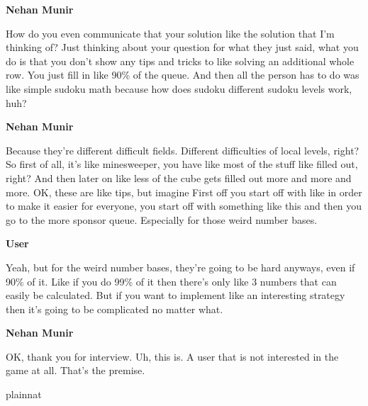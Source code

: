 \documentclass{article}
\begin{document}
\noindent \textbf{Nehan Munir}

How do you even communicate that your solution like the solution that I'm thinking of? Just thinking about your question for what they just said, what you do is that you don't show any tips and tricks to like solving an additional whole row. You just fill in like 90\% of the queue. And then all the person has to do was like simple sudoku math because how does sudoku different sudoku levels work, huh?

\noindent \textbf{Nehan Munir}

Because they're different difficult fields. Different difficulties of local levels, right? So first of all, it's like minesweeper, you have like most of the stuff like filled out, right? And then later on like less of the cube gets filled out more and more and more. OK, these are like tips, but imagine First off you start off with like in order to make it easier for everyone, you start off with something like this and then you go to the more sponsor queue. Especially for those weird number bases.

\noindent \textbf{User}

Yeah, but for the weird number bases, they're going to be hard anyways, even if 90\% of it. Like if you do 99\% of it then there's only like 3 numbers that can easily be calculated. But if you want to implement like an interesting strategy then it's going to be complicated no matter what.

\noindent \textbf{Nehan Munir}

OK, thank you for interview. Uh, this is. A user that is not interested in the game at all. That's the premise.

{}
 {plainnat}

\end{document}
